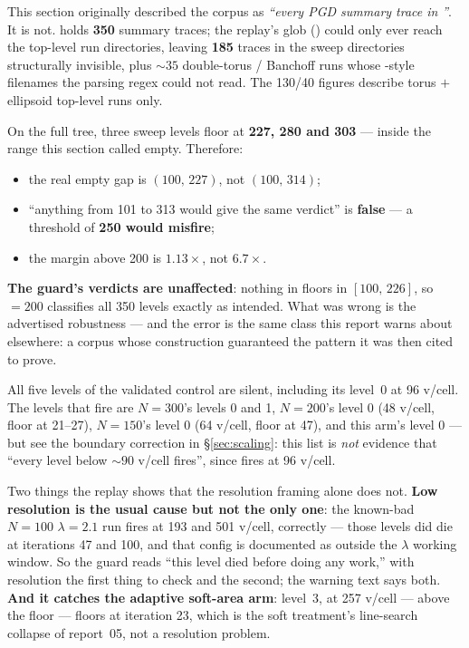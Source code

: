 \documentclass[11pt,a4paper]{article}
\begin{document}
\begin{tcolorbox}[colback=red!4!white,colframe=red!55!black,
  title={Correction (2026-08-15, adversarial review): the replay corpus was a
  subset, and the gap is narrower}]
This section originally described the corpus as \emph{``every PGD summary trace
in} \emph{''}. It is not.  holds \textbf{350}
summary traces; the replay's glob () could only ever
reach the top-level run directories, leaving \textbf{185} traces in the sweep
directories structurally invisible, plus \(\sim\!35\) double-torus / Banchoff runs
whose -style filenames the parsing regex could not read. The 130/40
figures describe torus \(+\) ellipsoid top-level runs only.

On the full tree, three  sweep levels floor at \textbf{227,
280 and 303} --- inside the range this section called empty. Therefore:

\begin{itemize}\itemsep2pt
  \item the real empty gap is \((100,\,227)\), not \((100,\,314)\);
  \item ``anything from 101 to 313 would give the same verdict'' is
    \textbf{false} --- a threshold of \textbf{250 would misfire};
  \item the margin above 200 is \(\mathbf{1.13\times}\), not \(6.7\times\).
\end{itemize}

\textbf{The guard's verdicts are unaffected}: nothing in  floors in
\([100,\,226]\), so  \(=200\) classifies all 350
levels exactly as intended. What was wrong is the advertised robustness --- and
the error is the same class this report warns about elsewhere: a corpus whose
construction guaranteed the pattern it was then cited to prove.
\end{tcolorbox}

All five levels of the validated control are silent, including its level~0 at
96 v/cell. The levels that fire are \(N{=}300\)'s levels 0 and 1, \(N{=}200\)'s
level 0 (48 v/cell, floor at 21--27), \(N{=}150\)'s level 0 (64 v/cell, floor at
47), and this arm's level 0 --- but see the boundary correction in
\S\ref{sec:scaling}: this list is \emph{not} evidence that ``every level below
\(\sim\!90\) v/cell fires'', since  fires at 96
v/cell.

Two things the replay shows that the resolution framing alone does not.
\textbf{Low resolution is the usual cause but not the only one}: the known-bad
\(N{=}100\) \(\lambda{=}2.1\) run  fires at 193 and
501 v/cell, correctly --- those levels did die at iterations 47 and 100, and that
config is documented as outside the \(\lambda\) working window. So the guard
reads ``this level died before doing any work,'' with resolution the first thing
to check and  the second; the warning text says both.
\textbf{And it catches the adaptive soft-area arm}: 
level~3, at 257 v/cell --- above the floor --- floors at iteration 23, which is
the soft treatment's line-search collapse of report~05, not a resolution
problem.
\end{document}
